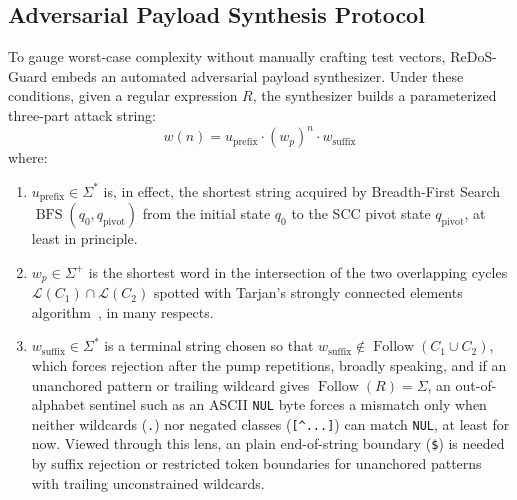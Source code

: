\documentclass{ieeeaccess}
\begin{document}
\subsection{Adversarial Payload Synthesis Protocol}
To gauge worst-case complexity without manually crafting test vectors, ReDoS-Guard embeds an automated adversarial payload synthesizer. Under these conditions, given a regular expression $R$, the synthesizer builds a parameterized three-part attack string:
\begin{equation}\label{eq:adv_payload_decomp}
w(n) = u_{\mathrm{prefix}} \cdot (w_p)^n \cdot w_{\mathrm{suffix}}
\end{equation}
where:
\begin{enumerate}
    \item $u_{\mathrm{prefix}} \in \Sigma^*$ is, in effect, the shortest string acquired by Breadth-First Search $\operatorname{BFS}(q_0, q_{\mathrm{pivot}})$ from the initial state $q_0$ to the SCC pivot state $q_{\mathrm{pivot}}$, at least in principle.
    \item $w_p \in \Sigma^+$ is the shortest word in the intersection of the two overlapping cycles $\mathcal{L}(C_1) \cap \mathcal{L}(C_2)$ spotted with Tarjan's strongly connected elements algorithm~\cite{tarjan1972depth}, in many respects.
    \item $w_{\mathrm{suffix}} \in \Sigma^*$ is a terminal string chosen so that $w_{\mathrm{suffix}} \notin \operatorname{Follow}(C_1 \cup C_2)$, which forces rejection after the pump repetitions, broadly speaking, and if an unanchored pattern or trailing wildcard gives $\operatorname{Follow}(R) = \Sigma$, an out-of-alphabet sentinel such as an ASCII \texttt{NUL} byte forces a mismatch only when neither wildcards (\texttt{.}) nor negated classes (\texttt{[\^{}...]}) can match \texttt{NUL}, at least for now. Viewed through this lens, an plain end-of-string boundary (\texttt{\$}) is needed by suffix rejection or restricted token boundaries for unanchored patterns with trailing unconstrained wildcards.
\end{enumerate}
\end{document}
